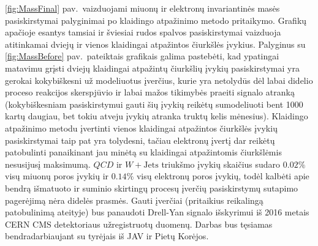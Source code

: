\documentclass[a4paper, 12pt, oneside]{article}
\newcommand{\WJets}{W\! +\!\mathrm{Jets}}
\newcommand{\QCD}{QC\! D}
\begin{document}
\ref{fig:MassFinal} pav.\ vaizduojami miuonų ir elektronų invariantinės masės pasiskirstymai palyginimai po klaidingo atpažinimo
metodo pritaikymo.
Grafikų apačioje esantys tamsiai ir šviesiai rudos spalvos pasiskirstymai vaizduoja atitinkamai dviejų ir vienos klaidingai
atpažintos čiurkšlės įvykius.
Palyginus su \ref{fig:MassBefore} pav.\ pateiktais grafikais galima pastebėti, kad ypatingai matavimu grįsti dviejų klaidingai
atpažintų čiurkšlių įvykių pasiskirstymai yra gerokai kokybiškesni už modeliuotus įverčius, kurie yra netolydūs dėl labai
didelio proceso reakcijos skerspjūvio ir labai mažos tikimybės praeiti signalo atranką (kokybiškesniam pasiskirstymui gauti
šių įvykių reikėtų sumodeliuoti bent 1000 kartų daugiau, bet tokiu atveju įvykių atranka truktų kelis mėnesius).
Klaidingo atpažinimo metodu įvertinti vienos klaidingai atpažintos čiurkšlės įvykių pasiskirstymai taip pat yra tolydesni,
tačiau elektronų įvertį dar reikėtų patobulinti panaikinant jau minėtą su klaidingai atpažintomis čiurkšlėmis nesusijusį maksimumą.
$\QCD$ ir $\WJets$ triukšmo įvykių skaičius sudaro $0.02\%$ visų miuonų poros įvykių ir $0.14\%$ visų elektronų poros įvykių,
todėl kalbėti apie bendrą išmatuoto ir suminio skirtingų procesų įverčių pasiskirstymų sutapimo pagerėjimą nėra didelės prasmės.
Gauti įverčiai (pritaikius reikalingą patobulinimą ateityje) bus panaudoti Drell-Yan signalo išskyrimui iš 2016 metais CERN CMS
detektoriaus užregistruotų duomenų.
Darbas bus tęsiamas bendradarbiaujant su tyrėjais iš JAV ir Pietų Korėjos.
\end{document}
